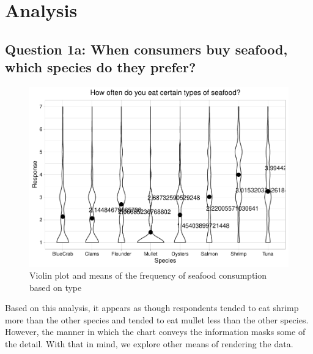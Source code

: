 \documentclass[
  12pt,
]{article}
\begin{document}
\newpage

\hypertarget{analysis}{%
\section{Analysis}\label{analysis}}

\hypertarget{question-1a-when-consumers-buy-seafood-which-species-do-they-prefer}{%
\subsection{Question 1a: When consumers buy seafood, which species do
they
prefer?}\label{question-1a-when-consumers-buy-seafood-which-species-do-they-prefer}}

\begin{figure}
\centering
\includegraphics{Final_rmd_files/figure-latex/freq violin-1.pdf}
\caption{Violin plot and means of the frequency of seafood consumption
based on type}
\end{figure}

Based on this analysis, it appears as though respondents tended to eat
shrimp more than the other species and tended to eat mullet less than
the other species. However, the manner in which the chart conveys the
information masks some of the detail. With that in mind, we explore
other means of rendering the data.
\end{document}
